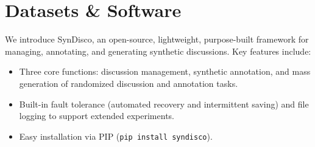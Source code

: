 \section{Datasets \& Software}

We introduce SynDisco, an open-source, lightweight, purpose-built framework for managing, annotating, and generating synthetic discussions. Key features include: 
\begin{itemize}[nosep, noitemsep]
    \item  Three core functions: discussion management, synthetic annotation, and mass generation of randomized discussion and annotation tasks.
    \item  Built-in fault tolerance (automated recovery and intermittent saving) and file logging to support extended experiments.
    \item Easy installation via PIP (\texttt{pip install syndisco}).
\end{itemize}     
